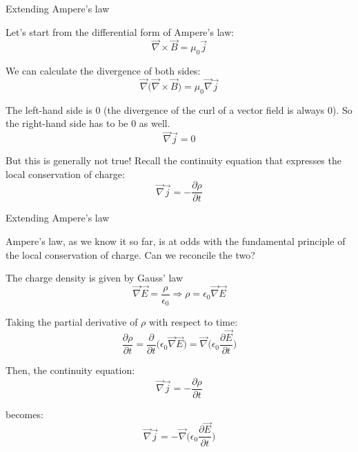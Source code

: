 %
%
%

\begin{frame}{Extending Ampere's law}

Let's start from the differential form of Ampere's law:
\begin{equation*}
  \vec{\nabla} \times \vec{B} = \mu_0 \vec{j}
\end{equation*}

We can calculate the divergence of both sides:
\begin{equation*}
  \vec{\nabla} \Big( \vec{\nabla} \times \vec{B} \Big) = \mu_0 \vec{\nabla} \vec{j}
\end{equation*}

The left-hand side is 0 (the divergence of the curl of a vector field is always 0).
So the right-hand side has to be 0 as well.
\begin{equation*}
  \vec{\nabla} \vec{j} = 0
\end{equation*}

But this is generally not true!
Recall the continuity equation that expresses the local conservation of charge:
\begin{equation*}
  \vec{\nabla} \vec{j} = -\frac{\partial \rho}{\partial t}
\end{equation*}

\end{frame}

%
%
%

\begin{frame}{Extending Ampere's law}

Ampere's law, as we know it so far, is at odds with the fundamental principle of
the local conservation of charge. Can we reconcile the two?

The charge density is given by Gauss' law
\begin{equation*}
  \vec{\nabla}\vec{E} = \frac{\rho}{\epsilon_0} \Rightarrow \rho = \epsilon_0 \vec{\nabla}\vec{E}
\end{equation*}

Taking the partial derivative of $\rho$ with respect to time:
\begin{equation*}
  \frac{\partial \rho}{\partial t} =
   \frac{\partial}{\partial t} \Big( \epsilon_0 \vec{\nabla}\vec{E} \Big) =
   \vec{\nabla} \Big( \epsilon_0 \frac{\partial \vec{E}}{\partial t} \Big)
\end{equation*}

Then, the continuity equation:
\begin{equation*}
  \vec{\nabla} \vec{j} = -\frac{\partial \rho}{\partial t}
\end{equation*}

becomes:
\begin{equation*}
  \vec{\nabla} \vec{j} = - \vec{\nabla} \Big( \epsilon_0 \frac{\partial \vec{E}}{\partial t} \Big)
\end{equation*}

\end{frame}


